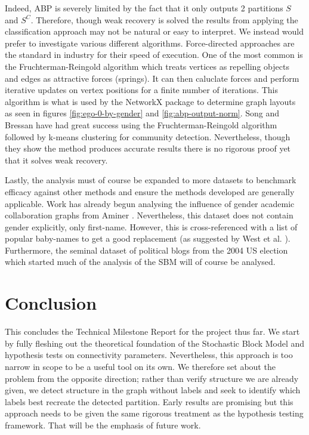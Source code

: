 \documentclass[11pt]{article}
\begin{document}
\begin{multicols*}{2}
Indeed, ABP is severely limited by the fact that it only outputs 2 partitions $S$ and $S^C$. Therefore, though weak recovery is solved the results from applying the classification approach may not be natural or easy to interpret. We instead would prefer to investigate various different algorithms. Force-directed approaches are the standard in industry for their speed of execution. One of the most common is the Fruchterman-Reingold algorithm which treats vertices as repelling objects and edges as attractive forces (springs). It can then caluclate forces and perform iterative updates on vertex positions for a finite number of iterations. This algorithm is what is used by the NetworkX package \cite{networkx} to determine graph layouts as seen in figures \ref{fig:ego-0-by-gender} and \ref{fig:abp-output-norm}. Song and Bressan \cite{force-directed} have had great success using the Fruchterman-Reingold algorithm followed by k-means clustering for community detection. Nevertheless, though they show the method produces accurate results there is no rigorous proof yet that it solves weak recovery.

Lastly, the analysis must of course be expanded to more datasets to benchmark efficacy against other methods and ensure the methods developed are generally applicable. Work has already begun analysing the influence of gender academic collaboration graphs from Aminer \cite{aminer}. Nevertheless, this dataset does not contain gender explicitly, only first-name. However, this is cross-referenced with a list of popular baby-names to get a good replacement (as suggested by West et al. \cite{gender-scholarship}). Furthermore, the seminal dataset of political blogs from the 2004 US election \cite{polblogs} which started much of the analysis of the SBM will of course be analysed.

\section{Conclusion}

This concludes the Technical Milestone Report for the project thus far. We start by fully fleshing out the theoretical foundation of the Stochastic Block Model and hypothesis tests on connectivity parameters. Nevertheless, this approach is too narrow in scope to be a useful tool on its own. We therefore set about the problem from the opposite direction; rather than verify structure we are already given, we detect structure in the graph without labels and seek to identify which labels best recreate the detected partition. Early results are promising but this approach needs to be given the same rigorous treatment as the hypothesis testing framework. That will be the emphasis of future work.

\printbibliography

\end{multicols*}
\end{document}
